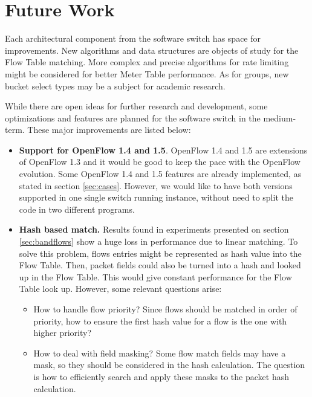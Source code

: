 \section{Future Work}

Each architectural component from the software switch has space for improvements. New algorithms and data structures are objects of study for the Flow Table matching. More complex and precise algorithms for rate limiting might be considered for better Meter Table performance. As for groups, new bucket select types may be a subject for academic research. 

While there are open ideas for further research and development, some optimizations and features are planned for the software switch in the medium-term. These major improvements are listed below:

\begin{itemize}

\item \textbf{Support for OpenFlow 1.4 and 1.5}. OpenFlow 1.4 and 1.5 are extensions of OpenFlow 1.3 and it would be good to keep the pace with the OpenFlow evolution. Some OpenFlow 1.4 and 1.5 features are already implemented, as stated in section \ref{sec:cases}. However, we would like to have both versions supported in one single switch running instance, without need to split the code in two different programs.

\item \textbf{Hash based match.} Results found in experiments presented on section \ref{sec:bandflows} show a huge loss in performance due to linear matching. To solve this problem, flows entries might be represented as hash value into the Flow Table. Then, packet fields could also be turned into a hash and looked up in the Flow Table. This would give constant performance for the Flow Table look up. However, some relevant questions arise: 

    \begin{itemize}
    \item How to handle flow priority? Since flows should be matched in order of priority, how to ensure the first hash value for a flow is the one with higher priority? 
    \item How to deal with field masking? Some flow match fields may have a mask, so they should be considered in the hash calculation. The question is how to efficiently search and apply these masks to the packet hash calculation. 
    \end{itemize}


\end{itemize}
